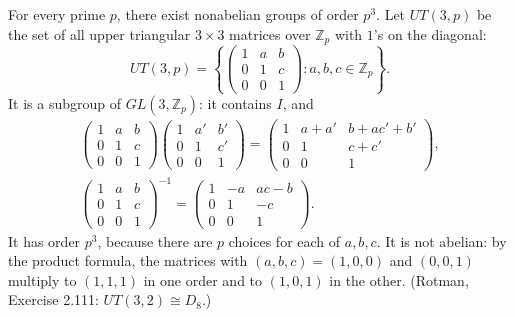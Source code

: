 \begin{eg}\label{eg:UT3p}
	For every prime \(p\), there exist nonabelian groups of order \(p^3\). Let
	\(UT(3,p)\) be the set of all upper triangular \(3 \times 3\) matrices over
	\(\mathbb Z_p\) with \(1\)'s on the diagonal:
	\[
		UT(3,p) = \left\{
		\begin{pmatrix} 1 & a & b \\ 0 & 1 & c \\ 0 & 0 & 1 \end{pmatrix}
		: a, b, c \in \mathbb Z_p \right\}.
	\]
	It is a subgroup of \(GL(3,\mathbb Z_p)\): it contains \(I\), and
	\begin{gather*}
		\begin{pmatrix} 1 & a & b \\ 0 & 1 & c \\ 0 & 0 & 1 \end{pmatrix}
		\begin{pmatrix} 1 & a' & b' \\ 0 & 1 & c' \\ 0 & 0 & 1 \end{pmatrix}
		= \begin{pmatrix} 1 & a+a' & b+ac'+b' \\ 0 & 1 & c+c' \\ 0 & 0 & 1 \end{pmatrix},
		\\
		\begin{pmatrix} 1 & a & b \\ 0 & 1 & c \\ 0 & 0 & 1 \end{pmatrix}^{-1}
		= \begin{pmatrix} 1 & -a & ac-b \\ 0 & 1 & -c \\ 0 & 0 & 1 \end{pmatrix}.
	\end{gather*}
	It has order \(p^3\), because there are \(p\) choices for each of \(a, b, c\). It is
	not abelian: by the product formula, the matrices with \((a,b,c) = (1,0,0)\) and
	\((0,0,1)\) multiply to \((1,1,1)\) in one order and to \((1,0,1)\) in the other.
	(Rotman, Exercise 2.111: \(UT(3,2) \cong D_8\).)
\end{eg}

